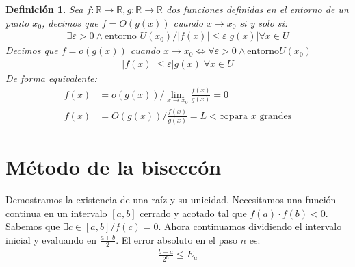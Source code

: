 \documentclass{article}
\newtheorem{defin}{Definición}
\begin{document}
\begin{defin}
    Sea $f: \mathbb{R} \to \mathbb{R}, g: \mathbb{R} \to \mathbb{R}$ dos funciones definidas en
    el entorno de un punto $x_{0}$, decimos que $f=O(g(x))$ cuando $x \to x_{0}$ si y solo si:
    \begin{equation}
        \begin{split}
            \exists \varepsilon > 0 \wedge \text{entorno }U(x_{0}) / |f(x)| \leq \varepsilon 
            |g(x)| \forall x \in U
        \end{split}
    \end{equation}
    Decimos que $f=o(g(x))$ cuando $x \to  x_{0} \iff \forall \varepsilon >0 \wedge \text{entorno} U(x_{0})$
    \begin{equation}
        \begin{split}
            |f(x)| \leq \varepsilon |g(x)| \forall x \in U
        \end{split}
    \end{equation}
    De forma equivalente:
    \begin{equation}
        \begin{split}
            f(x)&=o(g(x)) / \lim_{x \to x_{0}} \frac{f(x)}{g(x)} = 0\\
            f(x) &= O(g(x)) / \frac{f(x)}{g(x)} = L < \infty \text{para } x \text{ grandes}
        \end{split}
    \end{equation}
\end{defin}
\section{Método de la biseccón}
Demostramos la existencia de una raíz y su unicidad. Necesitamos una función continua en un
intervalo $[a,b]$ cerrado y acotado tal que $f(a)\cdot f(b) < 0$.\\
Sabemos que $\exists c \in [a,b] / f(c)=0$. Ahora continuamos dividiendo el intervalo inicial
y evaluando en $\frac{a+b}{2}$. El error absoluto en el paso $n$ es:
\begin{equation}
    \begin{split}
        \boxed{\frac{b-a}{2^{n}} \leq E_{a}}
    \end{split}
\end{equation}
\end{document}
